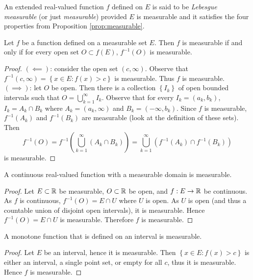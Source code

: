 \begin{definition}
	An extended real-valued function $f$ defined on $E$ is said to be
	\emph{Lebesgue measurable} (or just \emph{measurable})
	provided $E$ is measurable and it satisfies the four properties
	from Proposition \ref{prop:measurable}.
\end{definition}

\begin{proposition}[]
	Let $f$ be a function defined on a measurable set $E$.
	Then $f$ is measurable if and only if for every open set
	$O \subset f(E)$,
	$f^{-1}(O)$ is measurable.
\end{proposition}

\begin{proof}
	$(\impliedby)$:
	consider the open set $(c, \infty)$.
	Observe that
	$
		f^{-1}(c, \infty) =
		\left\{
			x \in E: f(x) > c
		\right\}
	$
	is measurable.
	Thus $f$ is measurable.
	$(\implies)$:
	let $O$ be open.
	Then there is a collection
	$
		\left\{
			I_k
		\right\}
	$
	of open bounded intervals such that
	$
		O = \bigcup_{k=1}^\infty I_k
	$.
	Observe that for every 
	$I_k = (a_k, b_k)$,
	$I_k = A_k \cap B_k$
	where $A_k = (a_k, \infty)$ and $B_k = (-\infty, b_k)$.
	Since $f$ is measurable, $f^{-1}(A_k)$ and $f^{-1}(B_k)$ are measurable
	(look at the definition of these sets).
	Then
	\[
		f^{-1}(O)
		= f^{-1}
		\left( 
			\bigcup_{k=1}^\infty (A_k \cap B_k) 
		\right)
		=
		\bigcup_{k=1}^\infty
		\left( 
			f^{-1}(A_k) \cap f^{-1}(B_k) 
		\right)
	\]
	is measurable.
\end{proof}

\begin{proposition}[]
	A continuous real-valued function with a measurable domain is measurable.
\end{proposition}

\begin{proof}
	Let $E \subset \mathbb{R}$ be measurable, $O \subset \mathbb{R}$ be open, and
	$f: E \to \mathbb{R}$ be continuous.
	As $f$ is continuous, 
	$f^{-1}(O) = E \cap U$ where $U$ is open.
	As $U$ is open (and thus a countable union of disjoint open intervals),
	it is measurable.
	Hence $f^{-1}(O) = E \cap U$ is measurable.
	Therefore $f$ is measurable.
\end{proof}

\begin{proposition}[]
	A monotone function that is defined on an interval is measurable.
\end{proposition}

\begin{proof}
	Let $E$ be an interval, hence it is measurable.
	Then
	$
		\left\{
			x \in E: f(x) > c
		\right\}
	$
	is either an interval, a single point set, or empty for all $c$, 
	thus it is measurable.
	Hence $f$ is measurable.
\end{proof}

